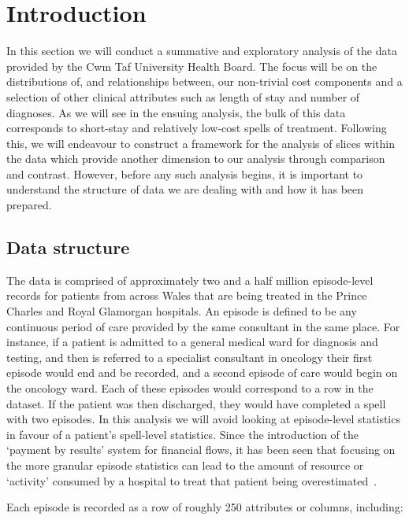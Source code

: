 \section{Introduction}\label{sec:intro}

In this section we will conduct a summative and exploratory analysis of the data
provided by the Cwm Taf University Health Board. The focus will be on the
distributions of, and relationships between, our non-trivial cost components
and a selection of other clinical attributes such as length of stay and number
of diagnoses. As we will see in the ensuing analysis, the bulk of this data
corresponds to short-stay and relatively low-cost spells of treatment. Following
this, we will endeavour to construct a framework for the analysis of slices
within the data which provide another dimension to our analysis through
comparison and contrast. However, before any such analysis begins, it is
important to understand the structure of data we are dealing with and how it has
been prepared.

\subsection{Data structure}\label{subsec:structure}

The data is comprised of approximately two and a half million episode-level
records for patients from across Wales that are being treated in the Prince
Charles and Royal Glamorgan hospitals. An episode is defined to be any
continuous period of care provided by the same consultant in the same place. For
instance, if a patient is admitted to a general medical ward for diagnosis and
testing, and then is referred to a specialist consultant in oncology their first
episode would end and be recorded, and a second episode of care would begin on
the oncology ward. Each of these episodes would correspond to a row in the
dataset. If the patient was then discharged, they would have completed a spell
with two episodes. In this analysis we will avoid looking at episode-level
statistics in favour of a patient's spell-level statistics. Since the
introduction of the `payment by results' system for financial flows, it has been
seen that focusing on the more granular episode statistics can lead to the
amount of resource or `activity' consumed by a hospital to treat that patient
being overestimated~\cite{BMJ2004}.

Each episode is recorded as a row of roughly 250 attributes or columns,
including:

